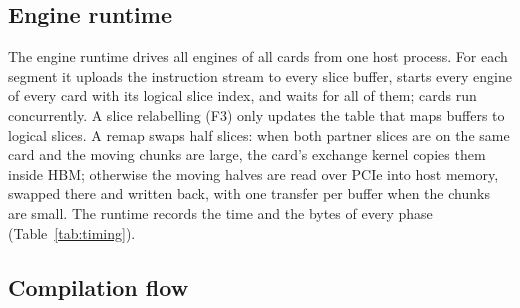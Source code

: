 \documentclass[pdflatex,sn-mathphys-num]{sn-jnl}
\theoremstyle{thmstyleone}
\theoremstyle{thmstylethree}
\begin{document}
\subsection{Engine runtime}\label{subsec:runtime}

The engine runtime drives all engines of all cards from one host process. For each segment it uploads the
instruction stream to every slice buffer, starts every engine of every card with its logical slice index, and waits
for all of them; cards run concurrently. A slice relabelling (F3) only updates the table that maps buffers to logical
slices. A remap swaps half slices: when both partner slices are on the same card and the moving chunks are large, the
card's exchange kernel copies them inside HBM; otherwise the moving halves are read over PCIe into host memory, swapped
there and written back, with one transfer per buffer when the chunks are small. The runtime records the time and the
bytes of every phase (Table~\ref{tab:timing}).

\subsection{Compilation flow}\label{subsec:compilation}
\end{document}
